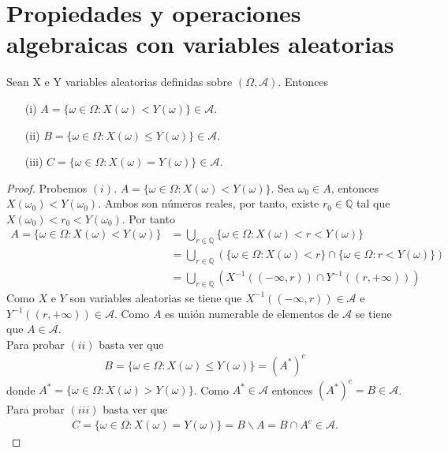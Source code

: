 \section{Propiedades y operaciones algebraicas con variables aleatorias}

\begin{teo}
Sean X e Y variables aleatorias definidas sobre $(\Omega, \mathcal{A})$. Entonces
\begin{enumerate}
    \item[(i)] $A = \{ \omega \in \Omega : X(\omega) < Y(\omega) \} \in \mathcal{A}$.
    \item[(ii)] $B = \{ \omega \in \Omega : X(\omega) \leq Y(\omega) \} \in \mathcal{A}$.
    \item[(iii)] $C = \{ \omega \in \Omega : X(\omega) = Y(\omega) \} \in \mathcal{A}$.
\end{enumerate}
\end{teo}

\begin{proof}
Probemos $(i)$. $A = \{ \omega \in \Omega : X(\omega) < Y(\omega) \}$. Sea $\omega_0 \in A$, entonces $X(\omega_0) < Y(\omega_0)$. Ambos son números reales, por tanto, existe $r_0 \in \mathbb{Q}$ tal que $X(\omega_0) < r_0 < Y(\omega_0)$. Por tanto
\begin{align*}
    A = \{ \omega \in \Omega : X(\omega) < Y(\omega) \} &= \bigcup_{r \in \mathbb{Q}}{\{ \omega \in \Omega : X(\omega) < r < Y(\omega) \}}\\
    &= \bigcup_{r \in \mathbb{Q}}{\left(\{ \omega \in \Omega : X(\omega) < r \} \cap \{ \omega \in \Omega :  r < Y(\omega) \}\right)} \\
    &= \bigcup_{r \in \mathbb{Q}}{\left( X^{-1}((-\infty, r)) \cap Y^{-1}((r,+\infty))\right)}
\end{align*}
Como $X$ e $Y$ son variables aleatorias se tiene que $ X^{-1}((-\infty, r)) \in \mathcal{A}$ e $Y^{-1}((r,+\infty)) \in \mathcal{A}$. Como $A$ es unión numerable de elementos de $\mathcal{A}$ se tiene que $A \in \mathcal{A}$.
\\
\newline
Para probar $(ii)$ basta ver que
\begin{align*}
    B = \{ \omega \in \Omega : X(\omega) \leq Y(\omega) \} = (A^*)^c
\end{align*}
donde $A^* = \{ \omega \in \Omega : X(\omega) > Y(\omega) \}$. Como $A^* \in \mathcal{A}$ entonces $(A^*)^c = B \in \mathcal{A}$.
\\
\newline
Para probar $(iii)$ basta ver que
\begin{align*}
    C = \{ \omega \in \Omega : X(\omega) = Y(\omega) \} = B \backslash A = B \cap A^c \in \mathcal{A}.
\end{align*}
\end{proof}

